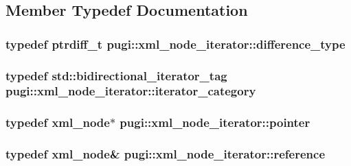 \subsection{Member Typedef Documentation}
\hypertarget{classpugi_1_1xml__node__iterator_af493930602ec2f56d27c84d148d692ef}{
\subsubsection[{difference\-\_\-type}]{\setlength{\rightskip}{0pt plus 5cm}typedef ptrdiff\-\_\-t {\bf pugi\-::xml\-\_\-node\-\_\-iterator\-::difference\-\_\-type}}}\label{classpugi_1_1xml__node__iterator_af493930602ec2f56d27c84d148d692ef}
\hypertarget{classpugi_1_1xml__node__iterator_ac65c62a919aa8818f0f1204ef0ab24c1}{
\subsubsection[{iterator\-\_\-category}]{\setlength{\rightskip}{0pt plus 5cm}typedef std\-::bidirectional\-\_\-iterator\-\_\-tag {\bf pugi\-::xml\-\_\-node\-\_\-iterator\-::iterator\-\_\-category}}}\label{classpugi_1_1xml__node__iterator_ac65c62a919aa8818f0f1204ef0ab24c1}
\hypertarget{classpugi_1_1xml__node__iterator_a8e5476d1f854eb64f92f42dac648acf1}{
\subsubsection[{pointer}]{\setlength{\rightskip}{0pt plus 5cm}typedef {\bf xml\-\_\-node}$\ast$ {\bf pugi\-::xml\-\_\-node\-\_\-iterator\-::pointer}}}\label{classpugi_1_1xml__node__iterator_a8e5476d1f854eb64f92f42dac648acf1}
\hypertarget{classpugi_1_1xml__node__iterator_ae2efdeb44673427f99b7cc1e726bfa13}{
\subsubsection[{reference}]{\setlength{\rightskip}{0pt plus 5cm}typedef {\bf xml\-\_\-node}\& {\bf pugi\-::xml\-\_\-node\-\_\-iterator\-::reference}}}\label{classpugi_1_1xml__node__iterator_ae2efdeb44673427f99b7cc1e726bfa13}
